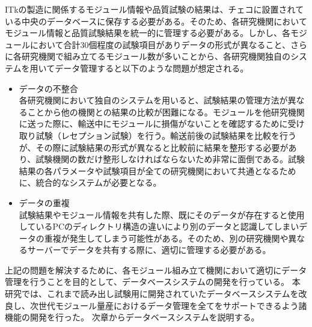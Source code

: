 ITkの製造に関係するモジュール情報や品質試験の結果は、チェコに設置されている中央のデータベースに保存する必要がある。そのため、各研究機関においてモジュール情報と品質試験結果を統一的に管理する必要がある。しかし、各モジュールにおいて合計$30$個程度の試験項目がありデータの形式が異なること、さらに各研究機関で組み立てるモジュール数が多いことから、各研究機関独自のシステムを用いてデータ管理すると以下のような問題が想定される。
\begin{itemize}
  \item データの不整合 \\
  各研究機関において独自のシステムを用いると、試験結果の管理方法が異なることから他の機関との結果の比較が困難になる。モジュールを他研究機関に送った際に、輸送中にモジュールに損傷がないことを確認するために受け取り試験（レセプション試験）を行う。輸送前後の試験結果を比較を行うが、その際に試験結果の形式が異なると比較前に結果を整形する必要があり、試験機関の数だけ整形しなければならないため非常に面倒である。試験結果の各パラメータや試験項目が全ての研究機関において共通となるために、統合的なシステムが必要となる。
  \item データの重複 \\
  試験結果やモジュール情報を共有した際、既にそのデータが存在すると使用しているPCのディレクトリ構造の違いにより別のデータと認識してしまいデータの重複が発生してしまう可能性がある。そのため、別の研究機関や異なるサーバーでデータを共有する際に、適切に管理する必要がある。
\end{itemize}

上記の問題を解決するために、各モジュール組み立て機関において適切にデータ管理を行うことを目的として、データベースシステムの開発を行っている。
本研究では、これまで読み出し試験用に開発されていたデータベースシステムを改良し、次世代モジュール量産におけるデータ管理を全てをサポートできるよう諸機能の開発を行った。
次章からデータベースシステムを説明する。

\newpage
